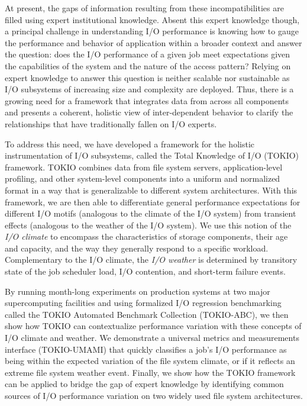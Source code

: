 At present, the gaps of information resulting from these incompatibilities are filled using expert institutional knowledge.
Absent this expert knowledge though, a principal challenge in understanding I/O performance is knowing how to gauge the performance and behavior of application within a broader context and answer the question: 
does the I/O performance of a given job meet expectations given the capabilities of the system and the nature of the access pattern?
Relying on expert knowledge to answer this question is neither scalable nor sustainable as I/O subsystems of increasing size and complexity are deployed.
Thus, there is a growing need for a framework that integrates data from across all components and presents a coherent, holistic view of inter-dependent behavior to clarify the relationships that have traditionally fallen on I/O experts.

To address this need, we have developed a framework for the holistic instrumentation of I/O subsystems, called the Total Knowledge of I/O (TOKIO) framework.
TOKIO combines data from file system servers, application-level profiling, and other system-level components into a uniform and normalized format in a way that is generalizable to different system architectures.
With this framework, we are then able to differentiate general performance expectations for different I/O motifs (analogous to the climate of the I/O system) from transient effects (analogous to the weather of the I/O system).
We use this notion of the \emph{I/O climate} to encompass the characteristics of storage components, their age and capacity, and the way they generally respond to a specific workload.
Complementary to the I/O climate, the \emph{I/O weather} is determined by transitory state of the job scheduler load, I/O contention, and short-term failure events.

By running month-long experiments on production systems at two major supercomputing facilities and using formalized I/O regression benchmarking called the TOKIO Automated Benchmark Collection (TOKIO-ABC), we then show how TOKIO can contextualize performance variation with these concepts of I/O climate and weather.
We demonstrate a universal metrics and measurements interface (TOKIO-UMAMI) that quickly classifies a job's I/O performance as being within the expected variation of the file system climate, or if it reflects an extreme file system weather event. 
Finally, we show how the TOKIO framework can be applied to bridge the gap of expert knowledge by identifying common sources of I/O performance variation on two widely used file system architectures.

